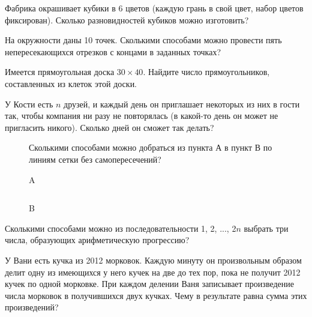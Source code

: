 \begin{thm}
    Фабрика окрашивает кубики в 6 цветов (каждую грань в свой цвет, набор цветов фиксирован). Сколько разновидностей кубиков можно изготовить?
\end{thm}

\begin{thm}
    На окружности даны 10 точек. Сколькими способами можно провести пять непересекающихся отрезков с концами в заданных точках?
\end{thm}

\begin{thm}
    Имеется прямоугольная доска $30 \times 40$. Найдите число прямоугольников, составленных из клеток этой доски.
\end{thm}

\begin{thm}
    У Кости есть $n$ друзей, и каждый день он приглашает некоторых из них в гости так, чтобы компания ни разу не повторялась (в какой-то день он может не пригласить никого). Сколько дней он сможет так делать?
\end{thm}

{\setlength{\intextsep}{2pt}
\begin{figure}[h]
\begin{minipage}{0.55\linewidth}\setlength{\parindent}{1.5em}
    \begin{thm}
    Сколькими способами можно добраться из пункта А
в пункт В по линиям сетки без самопересечений?
    \end{thm}
\end{minipage}
\hfill
\begin{minipage}{0.35\linewidth}\setlength{\parindent}{1.5em}
    A \begin{tabular}{ |m{.1em}|m{.1em}|m{.1em}|m{.1em}|m{.1em}|m{.1em}|m{.1em}|m{.1em}|m{.1em}|c| } 
    \hline
     & & & & & & & & & \\ 
    \hline
    \end{tabular} B
\end{minipage}
\end{figure}}

\begin{thm}
    Сколькими способами можно из последовательности 1, 2, ..., 2$n$ выбрать три числа, образующих арифметическую прогрессию?
\end{thm}

\begin{thm}
    У Вани есть кучка из 2012 морковок. Каждую минуту он произвольным образом делит одну из имеющихся у него кучек на две до тех пор, пока не получит 2012 кучек по одной морковке. При каждом делении Ваня записывает произведение числа морковок в получившихся двух кучках. Чему в результате равна сумма этих произведений?
\end{thm}

